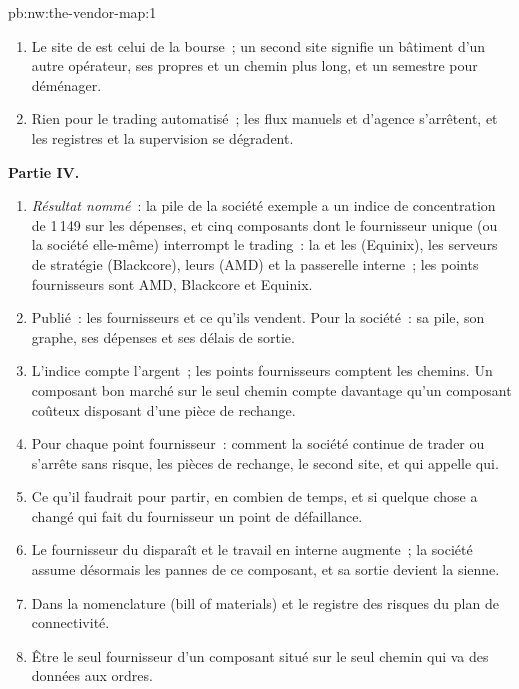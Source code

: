 \begin{solution}{pb:nw:the-vendor-map:1}
\begin{enumerate}[resume]
\item Le site de  est celui de la bourse~; un second site signifie un bâtiment d'un autre opérateur, ses propres  et un
  chemin plus long, et un semestre pour déménager.
\item Rien pour le trading automatisé~; les flux manuels et d'agence s'arrêtent, et les registres et la supervision se dégradent.
\end{enumerate}
\textbf{Partie IV.}
\begin{enumerate}[resume]
\item \emph{Résultat nommé}~: la pile de la société exemple a un indice de concentration de 1\,149 sur les dépenses, et cinq composants dont le fournisseur unique
  (ou la société elle-même) interrompt le trading~: la  et les  (Equinix), les serveurs de stratégie (Blackcore), leurs  (AMD)
  et la passerelle interne~; les points fournisseurs sont AMD, Blackcore et Equinix.
\item Publié~: les fournisseurs et ce qu'ils vendent. Pour la société~: sa pile, son graphe, ses dépenses et ses délais de sortie.
\item L'indice compte l'argent~; les points fournisseurs comptent les chemins. Un composant bon marché sur le seul chemin compte davantage qu'un composant coûteux
  disposant d'une pièce de rechange.
\item Pour chaque point fournisseur~: comment la société continue de trader ou s'arrête sans risque, les pièces de rechange, le second site, et qui appelle qui.
\item Ce qu'il faudrait pour partir, en combien de temps, et si quelque chose a changé qui fait du fournisseur un point de défaillance.
\item Le fournisseur du  disparaît et le travail en interne augmente~; la société assume désormais les pannes de ce composant, et sa sortie devient la sienne.
\item Dans la nomenclature (bill of materials) et le registre des risques du plan de connectivité.
\item Être le seul fournisseur d'un composant situé sur le seul chemin qui va des données aux ordres.
\end{enumerate}
\end{solution}

